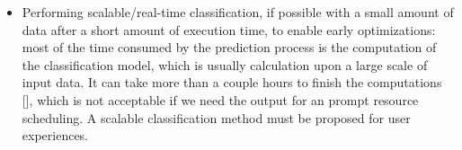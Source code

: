 \begin{itemize}
\item Performing scalable/real-time classification, if possible with a small amount of data after a short amount of execution time, to enable early optimizations: most of the time consumed by the prediction process is the computation of the classification model, which is usually calculation upon a  large scale of input data. It can take more than a couple hours to finish the computations [], which is not acceptable if we need the output for an prompt resource scheduling. A scalable classification method must be proposed for user experiences.
\end{itemize}
